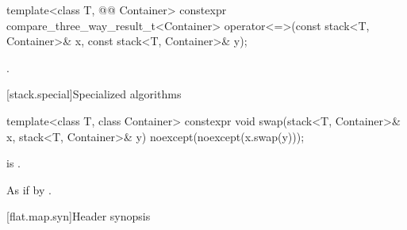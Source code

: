 %
\begin{itemdecl}
template<class T, @@ Container>
  constexpr compare_three_way_result_t<Container>
    operator<=>(const stack<T, Container>& x, const stack<T, Container>& y);
\end{itemdecl}

\begin{itemdescr}
\pnum
\returns
{}.
\end{itemdescr}

[stack.special]{Specialized algorithms}

%
\begin{itemdecl}
template<class T, class Container>
  constexpr void swap(stack<T, Container>& x, stack<T, Container>& y)
    noexcept(noexcept(x.swap(y)));
\end{itemdecl}

\begin{itemdescr}
\pnum
\constraints
{} is .

\pnum
\effects
As if by .
\end{itemdescr}

[flat.map.syn]{Header  synopsis}

